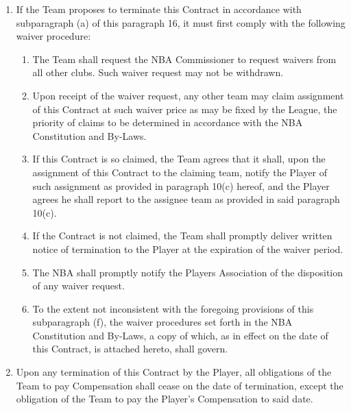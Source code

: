 \documentclass[
]{book}
\providecommand{\tightlist}{%
  \setlength{\itemsep}{0pt}\setlength{\parskip}{0pt}}
\begin{document}
\begin{enumerate}
\item
  If the Team proposes to terminate this Contract in accordance with subparagraph (a) of this paragraph 16, it must first comply with the following waiver procedure:

  \begin{enumerate}
  \def\labelenumii{(\roman{enumii})}
  \tightlist
  \item
    The Team shall request the NBA Commissioner to request waivers from all other clubs. Such waiver request may not be withdrawn.
  \item
    Upon receipt of the waiver request, any other team may claim assignment of this Contract at such waiver price as may be fixed by the League, the priority of claims to be determined in accordance with the NBA Constitution and By-Laws.
  \item
    If this Contract is so claimed, the Team agrees that it shall, upon the assignment of this Contract to the claiming team, notify the Player of such assignment as provided in paragraph 10(c) hereof, and the Player agrees he shall report to the assignee team as provided in said paragraph 10(c).
  \item
    If the Contract is not claimed, the Team shall promptly deliver written notice of termination to the Player at the expiration of the waiver period.
  \item
    The NBA shall promptly notify the Players Association of the disposition of any waiver request.
  \item
    To the extent not inconsistent with the foregoing provisions of this subparagraph (f), the waiver procedures set forth in the NBA Constitution and By-Laws, a copy of which, as in effect on the date of this Contract, is attached hereto, shall govern.
  \end{enumerate}
\item
  Upon any termination of this Contract by the Player, all obligations of the Team to pay Compensation shall cease on the date of termination, except the obligation of the Team to pay the Player's Compensation to said date.
\end{enumerate}
\end{document}
